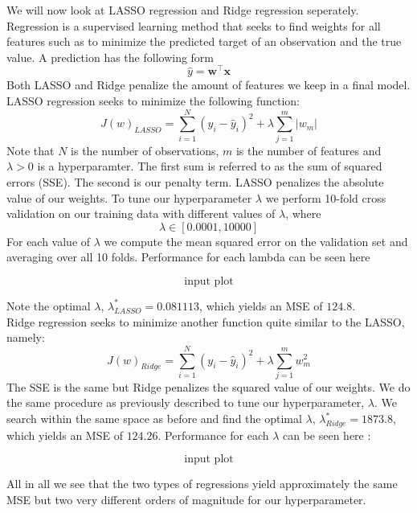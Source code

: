 \documentclass[12pt,a4paper]{article}
\begin{document}
We will now look at LASSO regression and Ridge regression seperately. Regression is a supervised learning method that seeks to find weights for all features such as to minimize the predicted target of an observation and the true value. A prediction has the following form
$$\hat{y} = \boldsymbol{w}^\intercal \boldsymbol{x}$$
Both LASSO and Ridge penalize the amount of features we keep in a final model. LASSO regression seeks to minimize the following function:
$$J(w)_{LASSO} = \sum_{i = 1}^{N}(y_i - \hat{y}_i)^2 + \lambda \sum_{j=1}^{m}|w_m|$$
Note that $N$ is the number of observations, $m$ is the number of features and $\lambda >0$ is a hyperparamter. The first sum is referred to as the sum of squared errors (SSE). The second is our penalty term. LASSO penalizes the absolute value of our weights. To tune our hyperparameter $\lambda$ we perform 10-fold cross validation on our training data with different values of $\lambda$, where
$$\lambda \in [0.0001, 10000]$$ 
For each value of $\lambda$ we compute the mean squared error on the validation set and averaging over all 10 folds. Performance for each lambda can be seen here

$$\text{input plot}$$

Note the optimal $\lambda$, $\lambda^*_{LASSO} = 0.081113$, which yields an MSE of $124.8$. \\
Ridge regression seeks to minimize another function quite similar to the LASSO, namely:
$$J(w)_{Ridge} = \sum_{i = 1}^{N}(y_i - \hat{y}_i)^2 + \lambda \sum_{j=1}^{m}w_m^2$$
The SSE is the same but Ridge penalizes the squared value of our weights. We do the same procedure as previously described to tune our hyperparameter, $\lambda$. We search within the same space as before and find the optimal $\lambda$, $\lambda^*_{Ridge} = 1873.8$, which yields an MSE of $124.26$. Performance for each $\lambda$ can be seen here :

$$\text{input plot}$$

All in all we see that the two types of regressions yield approximately the same MSE but two very different orders of magnitude for our hyperparameter. 
\end{document}
